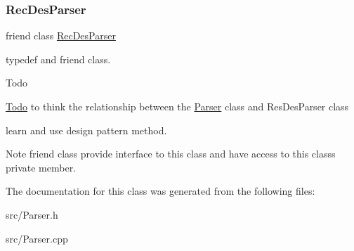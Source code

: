 \subsubsection{\texorpdfstring{Rec\+Des\+Parser}{RecDesParser}}
{\footnotesize\ttfamily friend class \hyperlink{class_rec_des_parser}{Rec\+Des\+Parser}\hspace{0.3cm}{\ttfamily [friend]}}



typedef and friend class. 

\begin{DoxyRefDesc}{Todo}
\item[\hyperlink{todo__todo000005}{Todo}]to think the relationship between the \hyperlink{class_parser}{Parser} class and Res\+Des\+Parser class 

learn and use design pattern method. \end{DoxyRefDesc}
\begin{DoxyNote}{Note}
friend class provide interface to this class and have access to this class\textquotesingle{}s private member. 
\end{DoxyNote}


The documentation for this class was generated from the following files\+:\begin{DoxyCompactItemize}
\item 
src/Parser.\+h\item 
src/Parser.\+cpp\end{DoxyCompactItemize}
